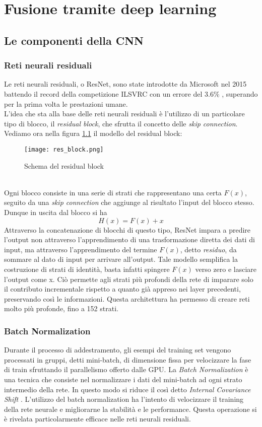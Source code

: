 \chapter{Fusione tramite deep learning}

\section{Le componenti della CNN}
\subsection{Reti neurali residuali}
Le reti neurali residuali, o ResNet, sono state introdotte da Microsoft nel 2015 battendo il record della competizione ILSVRC con un errore del 3.6\% \cite{resnet}, superando per la prima volta le prestazioni umane.\\
L'idea che sta alla base delle reti neurali residuali è l'utilizzo di un particolare tipo di blocco, il \textit{residual block}, che sfrutta il concetto delle \textit{skip connection}. \\
Vediamo ora nella figura \ref{resblock} il modello del residual block:
\begin{figure}[ht]
    \centering
    \texttt{[image: res\_block.png]}
    \caption[Residual block]{Schema del residual block \cite{resnet}}
    \label{resblock}
\end{figure}\\
Ogni blocco consiste in una serie di strati che rappresentano una certa $F(x)$, seguito da una \textit{skip connection} che aggiunge al risultato l'input del blocco stesso. Dunque in uscita dal blocco si ha
$$ H(x)=F(x)+x $$
Attraverso la concatenazione di blocchi di questo tipo, ResNet impara a predire l'output non attraverso l'apprendimento di una trasformazione diretta dei dati di input, ma attraverso l'apprendimento del termine $F(x)$, detto \textit{residuo}, da sommare al dato di input per arrivare all'output. Tale modello semplifica la costruzione di strati di identità, basta infatti spingere $F(x)$ verso zero e lasciare l'output come x. Ciò permette agli strati più profondi della rete di imparare solo il contributo incrementale rispetto a quanto già appreso nei layer precedenti, preservando così le informazioni. Questa architettura ha permesso di creare reti molto più profonde, fino a 152 strati.

\subsection{Batch Normalization}
Durante il processo di addestramento, gli esempi del training set vengono processati in gruppi, detti mini-batch, di dimensione fissa per velocizzare la fase di train sfruttando il parallelismo offerto dalle GPU. La \textit{Batch Normalization} è una tecnica che consiste nel normalizzare i dati del mini-batch ad ogni strato intermedio della rete. In questo modo si riduce il così detto \textit{Internal Covariance Shift} \cite{batchnormalization}. L'utilizzo del batch normalization ha l'intento di velocizzare il training della rete neurale e migliorarne la stabilità e le performance. Questa operazione si è rivelata particolarmente efficace nelle reti neurali residuali.

